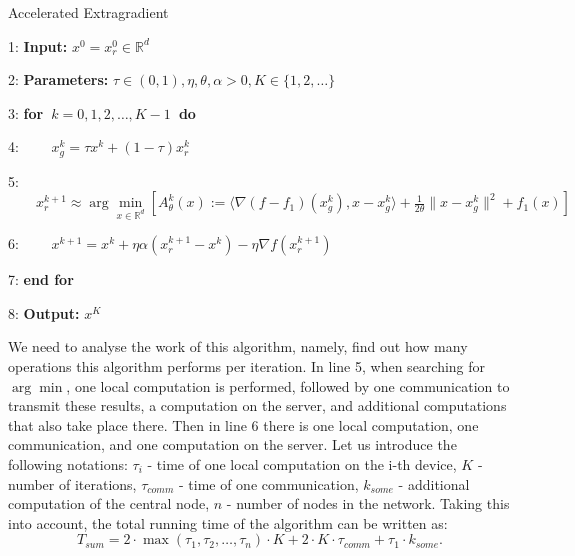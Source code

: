 \documentclass{article}
\begin{document}
\begin{algorithm}
\caption{Accelerated Extragradient}\label{alg:1}
\begin{algorithmic}
\item [1:] \textbf{Input:} $x^0 = x_r^0\in\mathbb R^d$
\item [2:] \textbf{Parameters:} $\tau\in (0, 1), \eta, \theta, \alpha > 0, K\in \{1, 2, \ldots\}$
\item [3:] \textbf{for~}$k = 0, 1, 2, \ldots, K-1$\textbf{~do}
\item [4:]    $\quad\quad x_g^k = \tau x^k + (1 - \tau)x_r^k$
\item [5:]    $\quad\quad x_r^{k+1} \approx \arg\underset{x\in\mathbb R^d}{\min} [A_{\theta}^k (x) := \langle \nabla (f - f_1)(x_g^k), x - x_g^k \rangle + \frac{1}{2\theta}\|x - x_g^k\|^2 + f_1(x)]$
\item [6:] $\quad\quad x^{k+1} = x^k + \eta\alpha(x_r^{k+1} - x^k) - \eta\nabla f(x_r^{k+1})$
\item [7:] \textbf{end for}
\item [8:] \textbf{Output:} $x^K$
\end{algorithmic}
\end{algorithm}

We need to analyse the work of this algorithm, namely, find out how many operations this algorithm performs per iteration. In line 5, when searching for $\arg\min$, one local computation is performed, followed by one communication to transmit these results, a computation on the server, and additional computations that also take place there. Then in line 6 there is one local computation, one communication, and one computation on the server. Let us introduce the following notations: $\tau_i$ - time of one local computation on the i-th device, $K$ - number of iterations, $\tau_{comm}$ - time of one communication, $k_{some}$ - additional computation of the central node, $n$ - number of nodes in the network. Taking this into account, the total running time of the algorithm can be written as:\\
\begin{equation}
    \label{eq:3}
    T_{sum} = 2\cdot\max(\tau_1, \tau_2, \ldots, \tau_n)\cdot K + 2\cdot K\cdot\tau_{comm} + \tau_1\cdot k_{some}.
\end{equation}
\end{document}

